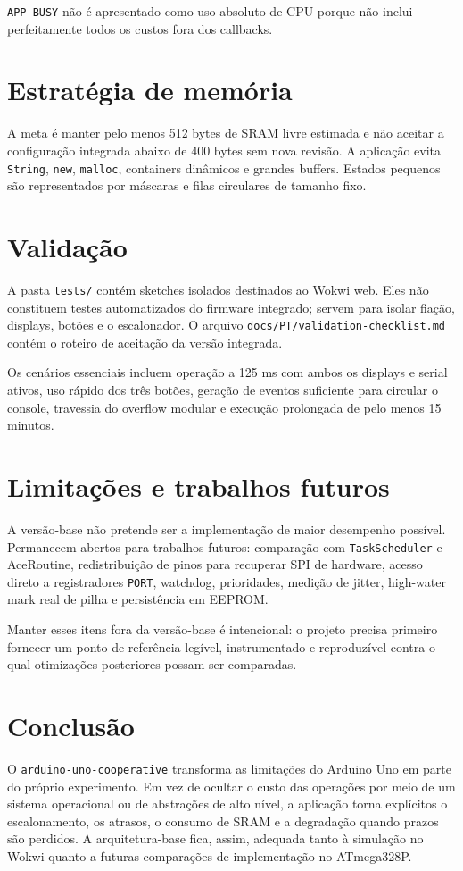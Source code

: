 \documentclass[12pt,a4paper]{article}
\begin{document}
\texttt{APP BUSY} não é apresentado como uso absoluto de CPU porque não inclui
perfeitamente todos os custos fora dos callbacks.

\section{Estratégia de memória}

A meta é manter pelo menos 512 bytes de SRAM livre estimada e não aceitar a
configuração integrada abaixo de 400 bytes sem nova revisão. A aplicação evita
\texttt{String}, \texttt{new}, \texttt{malloc}, containers dinâmicos e grandes
buffers. Estados pequenos são representados por máscaras e filas circulares de
tamanho fixo.

\section{Validação}

A pasta \texttt{tests/} contém sketches isolados destinados ao Wokwi web. Eles
não constituem testes automatizados do firmware integrado; servem para isolar
fiação, displays, botões e o escalonador. O arquivo
\texttt{docs/PT/validation-checklist.md} contém o roteiro de aceitação da versão
integrada.

Os cenários essenciais incluem operação a 125 ms com ambos os displays e serial
ativos, uso rápido dos três botões, geração de eventos suficiente para circular
o console, travessia do overflow modular e execução prolongada de pelo menos
15 minutos.

\section{Limitações e trabalhos futuros}

A versão-base não pretende ser a implementação de maior desempenho possível.
Permanecem abertos para trabalhos futuros: comparação com \texttt{TaskScheduler}
e AceRoutine, redistribuição de pinos para recuperar SPI de hardware, acesso
direto a registradores \texttt{PORT}, watchdog, prioridades, medição de jitter,
high-water mark real de pilha e persistência em EEPROM.

Manter esses itens fora da versão-base é intencional: o projeto precisa primeiro
fornecer um ponto de referência legível, instrumentado e reproduzível contra o
qual otimizações posteriores possam ser comparadas.

\section{Conclusão}

O \texttt{arduino-uno-cooperative} transforma as limitações do Arduino Uno em
parte do próprio experimento. Em vez de ocultar o custo das operações por meio de
um sistema operacional ou de abstrações de alto nível, a aplicação torna
explícitos o escalonamento, os atrasos, o consumo de SRAM e a degradação quando
prazos são perdidos. A arquitetura-base fica, assim, adequada tanto à simulação
no Wokwi quanto a futuras comparações de implementação no ATmega328P.
\end{document}
